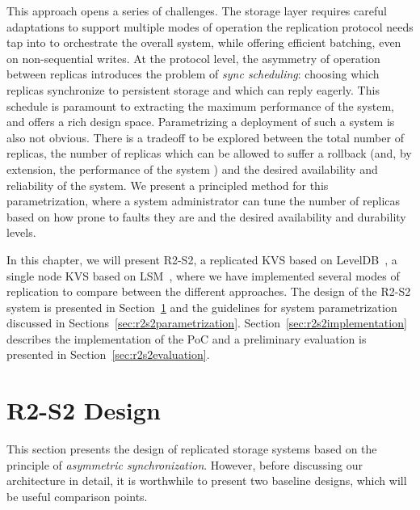 This approach opens a series of challenges. The storage layer
requires careful adaptations to support multiple modes of
operation the replication protocol needs tap into to orchestrate
the overall system, while offering efficient batching, even on
non-sequential writes. At the protocol level, the asymmetry of
operation between replicas introduces the problem of \emph{sync
scheduling}: choosing which replicas synchronize to persistent storage
and which can reply eagerly. This schedule is paramount to
extracting the maximum performance of the system, and offers a
rich design space. Parametrizing a deployment of such a system is
also not obvious. There is a tradeoff to be explored between the
total number of replicas, the number of replicas which can be
allowed to suffer a rollback (and, by extension, the performance
of the system ) and the desired
availability and reliability of the system. We present a
principled method for this parametrization, where a system
administrator can tune the number of replicas based on how prone
to faults they are and the desired availability and durability
levels.


In this chapter, we will present \ac{R2-S2}, a replicated
\ac{KVS} based on LevelDB~\cite{leveldb}, a single node \ac{KVS}
based on \ac{LSM}~\cite{lsm}, where we have implemented several modes
of replication to compare between the different approaches. The
design of the \ac{R2-S2} system is presented in
Section~\ref{sec:r2s2design} and the guidelines for system
parametrization discussed in
Sections~\ref{sec:r2s2parametrization}.
Section~\ref{sec:r2s2implementation} describes the implementation
of the PoC and a preliminary evaluation is presented in
Section~\ref{sec:r2s2evaluation}.

\section{\ac{R2-S2} Design}\label{sec:r2s2design}

This section presents the design of replicated storage systems
based on the principle of \emph{asymmetric synchronization}. However,
before discussing our architecture in detail, it is worthwhile to
present two baseline designs, which will be useful comparison
points.

